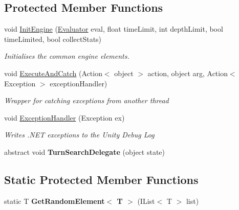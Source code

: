 \subsection*{Protected Member Functions}
\begin{DoxyCompactItemize}
\item 
void \hyperlink{class_universal_turn_based_a_i_1_1_turn_engine_a9b0c7d8f95391abd7d1840c2e9d0103f}{Init\+Engine} (\hyperlink{class_universal_turn_based_a_i_1_1_evaluator}{Evaluator} eval, float time\+Limit, int depth\+Limit, bool time\+Limited, bool collect\+Stats)
\begin{DoxyCompactList}\small\item\em Initialises the common engine elements. \end{DoxyCompactList}\item 
void \hyperlink{class_universal_turn_based_a_i_1_1_turn_engine_a7b14c450da986c60ebab0d992081371c}{Execute\+And\+Catch} (Action$<$ object $>$ action, object arg, Action$<$ Exception $>$ exception\+Handler)
\begin{DoxyCompactList}\small\item\em Wrapper for catching exceptions from another thread \end{DoxyCompactList}\item 
void \hyperlink{class_universal_turn_based_a_i_1_1_turn_engine_a1d1d7061052986196974028919d5c45f}{Exception\+Handler} (Exception ex)
\begin{DoxyCompactList}\small\item\em Writes .N\+E\+T exceptions to the Unity Debug Log \end{DoxyCompactList}\item 
\hypertarget{class_universal_turn_based_a_i_1_1_turn_engine_af34e85df941ad5c3cb3b1af7260752fe}{}abstract void {\bfseries Turn\+Search\+Delegate} (object state)\label{class_universal_turn_based_a_i_1_1_turn_engine_af34e85df941ad5c3cb3b1af7260752fe}

\end{DoxyCompactItemize}
\subsection*{Static Protected Member Functions}
\begin{DoxyCompactItemize}
\item 
\hypertarget{class_universal_turn_based_a_i_1_1_turn_engine_a2f0108600a38970fa4f8d46ac5919e3d}{}static T {\bfseries Get\+Random\+Element$<$ T $>$} (I\+List$<$ T $>$ list)\label{class_universal_turn_based_a_i_1_1_turn_engine_a2f0108600a38970fa4f8d46ac5919e3d}

\end{DoxyCompactItemize}
